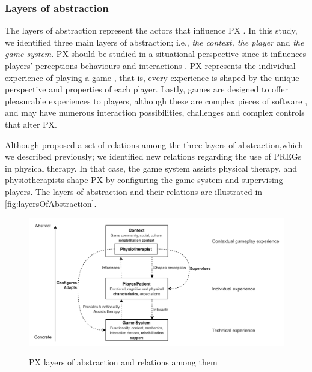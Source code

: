 \subsubsection{Layers of abstraction}
\label{sec:layers_abstraction}
The layers of abstraction represent the actors that influence \ac{PX} \autocite{Nacked,Nackea2,Engl2013,Elson2014}. In this study, we identified three main layers of abstraction; i.e., \textit{the context, the player} and \textit{the game system}. \ac{PX} should be studied in a situational perspective \autocite{Nacked,DeKort2007b} since it influences players' perceptions \autocite{Elson2014} behaviours and interactions \autocite{Engl2013,DeKort2007b}. \ac{PX} represents the individual experience of playing a game \autocite{Engl2013,Nackea2}, that is, every experience is shaped by the unique perspective \autocite{Fernandez2008} and properties \autocite{Nacked} of each player. Lastly, games are designed to offer pleasurable experiences to players, although these are complex pieces of software \autocite{Nackea}, and may have numerous interaction possibilities, challenges and complex controls \autocite{Nacked} that alter \ac{PX}.

Although \textcite{Nackea2} proposed a set of relations among the three layers of abstraction,which we described previously; we identified new relations regarding the use of \acp{PREG} in physical therapy. In that case, the game system assists physical therapy, and physiotherapists shape \ac{PX} by configuring the game system and supervising players. The layers of abstraction and their relations are illustrated in \autoref{fig:layersOfAbstraction}.

\begin{figure}[bth]
\myfloatalign
{\includegraphics[width=\linewidth]{gfx/model/layersOfAbstraction}} \quad
\caption{\ac{PX} layers of abstraction and relations among them} \label{fig:layersOfAbstraction}
\end{figure}

